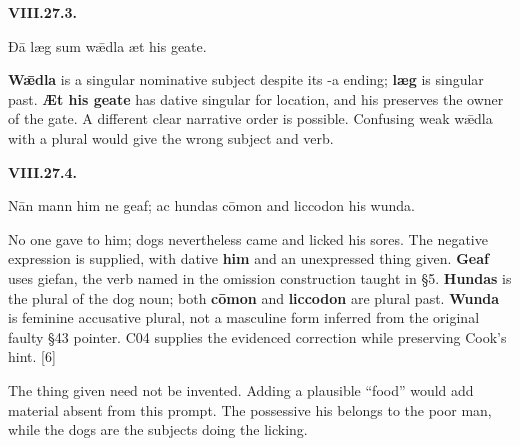 \par\begin{minipage}{\linewidth}\raggedright
\textbf{VIII.27.3.}

Ðā læg sum wǣdla æt his geate.

\textbf{Wǣdla} is a singular nominative subject despite its -a ending; \textbf{læg} is singular past. \textbf{Æt his geate} has dative singular for location, and his preserves the owner of the gate. A different clear narrative order is possible. Confusing weak wǣdla with a plural would give the wrong subject and verb.

\end{minipage}\par\addvspace{4pt}

\par\begin{minipage}{\linewidth}\raggedright
\textbf{VIII.27.4.}

Nān mann him ne geaf; ac hundas cōmon and liccodon his wunda.

No one gave to him; dogs nevertheless came and licked his sores. The negative expression is supplied, with dative \textbf{him} and an unexpressed thing given. \textbf{Geaf} uses giefan, the verb named in the omission construction taught in §5. \textbf{Hundas} is the plural of the dog noun; both \textbf{cōmon} and \textbf{liccodon} are plural past. \textbf{Wunda} is feminine accusative plural, not a masculine form inferred from the original faulty §43 pointer. C04 supplies the evidenced correction while preserving Cook's hint. [6]

The thing given need not be invented. Adding a plausible “food” would add material absent from this prompt. The possessive his belongs to the poor man, while the dogs are the subjects doing the licking.

\end{minipage}\par\addvspace{4pt}

